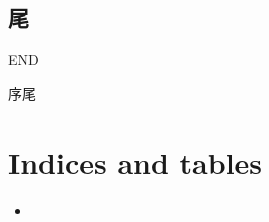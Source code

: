 \documentclass[letterpaper,10pt,english]{sphinxmanual}
\begin{document}
\section{尾}
\label{\detokenize{poem/END::doc}}\label{\detokenize{poem/END:id1}}
END

序尾


\chapter{Indices and tables}
\label{\detokenize{index:indices-and-tables}}\label{\detokenize{index:id2}}\begin{itemize}
\item {} 

\end{itemize}



\renewcommand{\indexname}{Index}
\printindex
\end{document}
